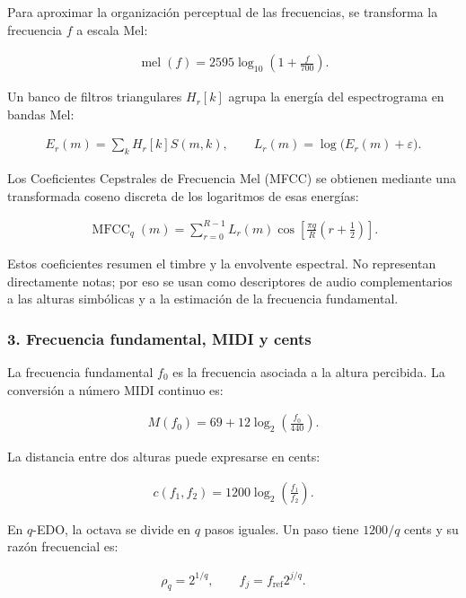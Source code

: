 \documentclass[11pt, a4paper]{article}
\begin{document}
Para aproximar la organización perceptual de las frecuencias, se transforma la frecuencia $f$ a escala Mel:

\begin{align}
\operatorname{mel}(f)=2595\log_{10}\left(1+\frac{f}{700}\right).
\end{align}

Un banco de filtros triangulares $H_r[k]$ agrupa la energía del espectrograma en bandas Mel:

\begin{align}
E_r(m)=\sum_k H_r[k]S(m,k), \qquad
L_r(m)=\log\bigl(E_r(m)+\varepsilon\bigr).
\end{align}

Los Coeficientes Cepstrales de Frecuencia Mel (MFCC) se obtienen mediante una transformada coseno discreta de los logaritmos de esas energías:

\begin{align}
\operatorname{MFCC}_q(m)=\sum_{r=0}^{R-1}L_r(m)\cos\left[\frac{\pi q}{R}\left(r+\frac12\right)\right].
\end{align}

Estos coeficientes resumen el timbre y la envolvente espectral. No representan directamente notas; por eso se usan como descriptores de audio complementarios a las alturas simbólicas y a la estimación de la frecuencia fundamental.

\subsubsection*{3. Frecuencia fundamental, MIDI y cents}

La frecuencia fundamental $f_0$ es la frecuencia asociada a la altura percibida. La conversión a número MIDI continuo es:

\begin{align}
M(f_0)=69+12\log_2\left(\frac{f_0}{440}\right).
\end{align}

La distancia entre dos alturas puede expresarse en cents:

\begin{align}
c(f_1,f_2)=1200\log_2\left(\frac{f_1}{f_2}\right).
\end{align}

En $q$-EDO, la octava se divide en $q$ pasos iguales. Un paso tiene $1200/q$ cents y su razón frecuencial es:

\begin{align}
\rho_q=2^{1/q}, \qquad f_j=f_\mathrm{ref}2^{j/q}.
\end{align}
\end{document}
